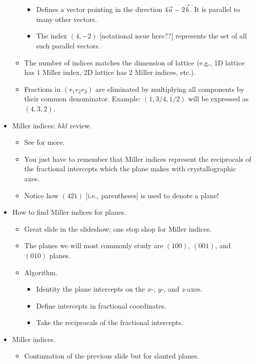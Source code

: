 \documentclass[../notes.tex]{subfiles}
\begin{document}
\begin{itemize}
\begin{itemize}
\begin{itemize}
            \item Defines a vector pointing in the direction $4\vec{a}-2\vec{b}$. It is parallel to many other vectors.
            \item The index $(4,-2)$ [notational issue here??] represents the set of all such parallel vectors.
        \end{itemize}
        \item The number of indices matches the dimension of lattice (e.g., 1D lattice has 1 Miller index, 2D lattice has 2 Miller indices, etc.).
        \item Fractions in $(r_1r_2r_3)$ are eliminated by multiplying all components by their common denominator. Example: $(1,3/4,1/2)$ will be expressed as $(4,3,2)$.
    \end{itemize}
    \item Miller indices: $hkl$ review.
    \begin{itemize}
        \item See \textcite{bib:CHEM26300Notes} for more.
        \item You just have to remember that Miller indices represent the reciprocals of the fractional intercepts which the plane makes with crystallographic axes.
        \item Notice how $(421)$ [i.e., parentheses] is used to denote a plane!
    \end{itemize}
    \item How to find Miller indices for planes.
    \begin{itemize}
        \item Great slide in the slideshow; one stop shop for Miller indices.
        \item The planes we will most commonly study are $(100)$, $(001)$, and $(010)$ planes.
        \item Algorithm.
        \begin{itemize}
            \item Identity the plane intercepts on the $x$-, $y$-, and $z$-axes.
            \item Define intercepts in fractional coordinates.
            \item Take the reciprocals of the fractional intercepts.
        \end{itemize}
    \end{itemize}
    \item Miller indices.
    \begin{itemize}
        \item Continuation of the previous slide but for slanted planes.

\end{itemize}
\end{itemize}
\end{document}
